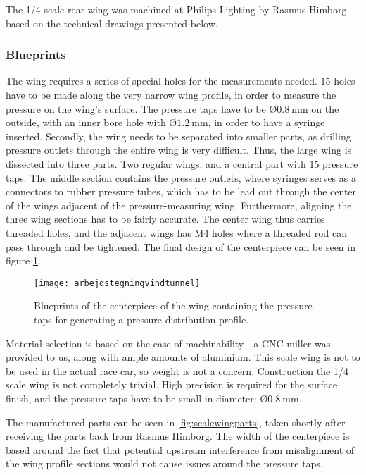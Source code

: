     The 1/4 scale rear wing was machined at Philips Lighting by Rasmus Himborg based on the technical drawings presented below.

    \subsubsection{Blueprints}

      The wing requires a series of special holes for the measurements needed. 15 holes have to be made along the very narrow wing profile, in order to measure the pressure on the wing's surface. The pressure taps have to be $Ø\SI{0.8}{\milli\metre}$ on the outside, with an inner bore hole with $Ø\SI{1.2}{\milli\metre}$, in order to have a syringe inserted. Secondly, the wing needs to be separated into smaller parts, as drilling pressure outlets through the entire wing is very difficult. Thus, the large wing is dissected into three parts. Two regular wings, and a central part with 15 pressure taps. The middle section contains the pressure outlets, where syringes serves as a connectors to rubber pressure tubes, which has to be lead out through the center of the wings adjacent of the pressure-measuring wing. Furthermore, aligning the three wing sections has to be fairly accurate. The center wing thus carries threaded holes, and the adjacent wings has M4 holes where a threaded rod can pass through and be tightened. The final design of the centerpiece can be seen in figure \ref{fig:scalewingblueprint}.

      \begin{figure}
        \texttt{[image: arbejdstegningvindtunnel]}
        \caption{Blueprints of the centerpiece of the wing containing the pressure taps for generating a pressure distribution profile.}
        \label{fig:scalewingblueprint}
      \end{figure}

      Material selection is based on the ease of machinability - a CNC-miller was provided to us, along with ample amounts of aluminium. This scale wing is not to be used in the actual race car, so weight is not a concern. Construction the 1/4 scale wing is not completely trivial. High precision is required for the surface finish, and the pressure taps have to be small in diameter: $Ø\SI{0.8}{\milli\metre}$.

      The manufactured parts can be seen in \ref{fig:scalewingparts}, taken shortly after receiving the parts back from Rasmus Himborg. The width of the centerpiece is based around the fact that potential upstream interference from misalignment of the wing profile sections would not cause issues around the pressure taps.

